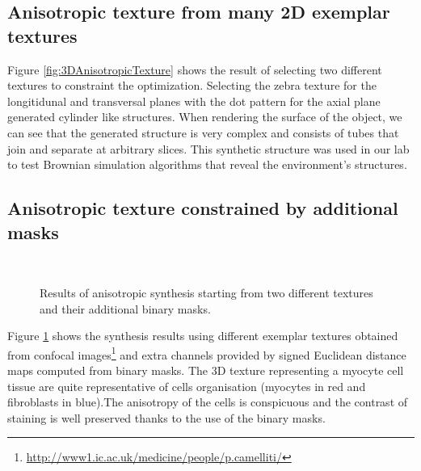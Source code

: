 \subsection{Anisotropic texture from many 2D exemplar textures}

Figure \ref{fig:3DAnisotropicTexture} shows the result of selecting two different textures 
to constraint the optimization.
Selecting the zebra texture for the longitidunal and transversal planes with the dot pattern for the axial plane generated cylinder like structures. 
When rendering the surface of the object, we can see that the generated structure 
is very complex and consists of tubes that join and separate at arbitrary slices.
This synthetic structure was used in our lab to test Brownian simulation algorithms 
that reveal the environment's structures.

\subsection{Anisotropic texture constrained by additional masks }

\begin{figure}
 \centering 
  \\
 \caption{Results of anisotropic synthesis starting from two different textures and their additional binary masks.}
 \label{fig:3DAnisotropicTextureAndMask}
\end{figure}

Figure \ref{fig:3DAnisotropicTextureAndMask} shows the synthesis results using different exemplar textures obtained from confocal images\footnote{\url{http://www1.ic.ac.uk/medicine/people/p.camelliti/}} and extra channels provided by signed Euclidean distance maps computed from  binary masks. 
The 3D texture representing a myocyte cell tissue are quite representative of cells organisation (myocytes in red and fibroblasts in blue).The anisotropy of the cells is conspicuous and the contrast of staining is well preserved thanks to the use of the binary masks. 


